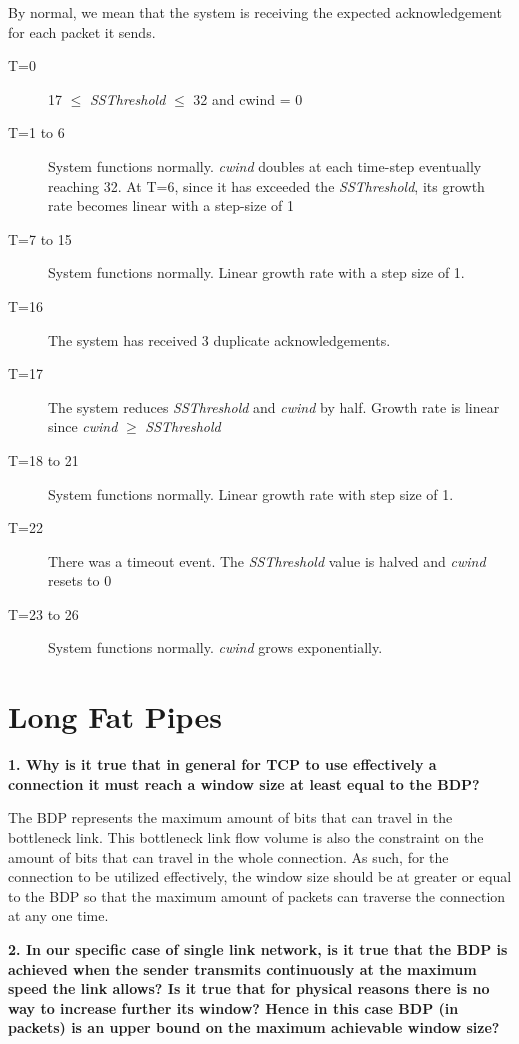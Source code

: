 \documentclass[]{article}
\begin{document}
By normal, we mean that the system is receiving the expected acknowledgement for each packet it sends.
\begin{description}
\item[T=0] 17 $\leq$ \textit{SSThreshold} $\leq$ 32 and cwind = 0
\item[T=1 to 6] System functions normally. \textit{cwind} doubles at each time-step eventually reaching 32. At T=6, since it has exceeded the \textit{SSThreshold}, its growth rate becomes linear with a step-size of 1
\item[T=7 to 15] System functions normally. Linear growth rate with a step size of 1. 
\item[T=16] The system has received 3 duplicate acknowledgements.
\item[T=17] The system reduces \textit{SSThreshold} and \textit{cwind} by half. Growth rate is linear since \textit{cwind} $\geq$ \textit{SSThreshold}
\item[T=18 to 21] System functions normally. Linear growth rate with step size of 1.  
\item[T=22] There was a timeout event. The \textit{SSThreshold} value is halved and \textit{cwind} resets to 0
\item[T=23 to 26] System functions normally. \textit{cwind} grows exponentially.
\end{description}

\section{Long Fat Pipes}

\textbf{1. Why is it true that in general for TCP to use effectively a connection it must reach a window size at least equal to the BDP?}

The BDP represents the maximum amount of bits that can travel in the bottleneck link. This bottleneck link flow volume is also the constraint on the amount of bits that can travel in the whole connection. As such, for the connection to be utilized effectively, the window size should be at greater or equal to the BDP so that the maximum amount of packets can traverse the connection at any one time.

\textbf{2. In our specific case of single link network, is it true that the BDP is achieved when the sender transmits continuously at the maximum speed the link allows? Is it true that for physical reasons there is no way to increase further its window? Hence in this case BDP (in packets) is an upper bound on the maximum achievable window size?}
\end{document}

